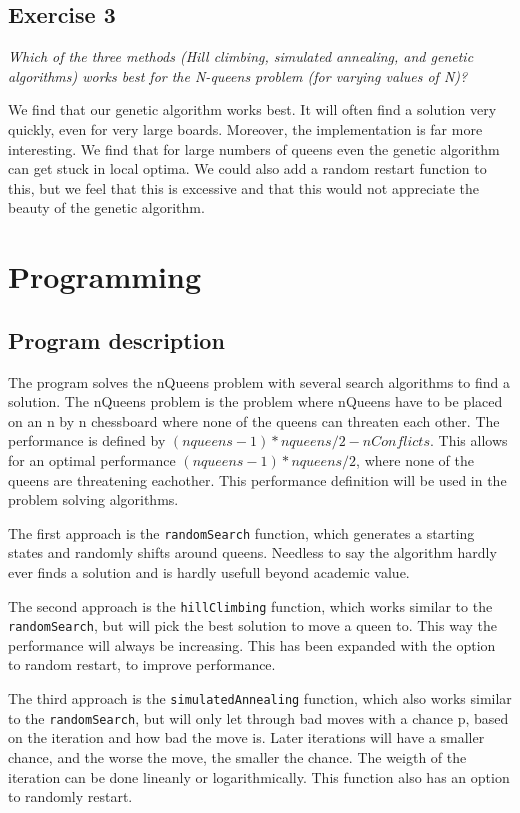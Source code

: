 \documentclass{article}
\begin{document}
\subsection*{Exercise 3}


\textit{Which of the three methods (Hill climbing, simulated annealing, and genetic algorithms) works best for the N-queens problem (for varying values of N)?}

We find that our genetic algorithm works best. It will often find a solution very quickly, even for very large boards. Moreover, the implementation is far more interesting. We find that for large numbers of queens even the genetic algorithm can get stuck in local optima. We could also add a random restart function to this, but we feel that this is excessive and that this would not appreciate the beauty of the genetic algorithm.


\section*{Programming} 
\subsection*{Program description}
The program solves the nQueens problem with several search algorithms to find a solution. The nQueens problem is the problem where nQueens have to be placed on an n by n chessboard where none of the queens can threaten each other.
The performance is defined by $ (nqueens-1)*nqueens/2 -nConflicts$. This allows for an optimal performance $(nqueens-1)*nqueens/2$, where none of the queens are threatening eachother. This performance definition will be used in the problem solving algorithms.

The first approach is the \verb!randomSearch! function, which generates a starting states and randomly shifts around queens. Needless to say the algorithm hardly ever finds a solution and is hardly usefull beyond academic value.

The second approach is the \verb!hillClimbing! function, which works similar to the \verb!randomSearch!, but will pick the best solution to move a queen to. This way the performance will always be increasing. This has been expanded with the option to random restart, to improve performance.

The third approach is the \verb!simulatedAnnealing! function, which also works similar to the \verb!randomSearch!, but will only let through bad moves with a chance p, based on the iteration and how bad the move is. Later iterations will have a smaller chance, and the worse the move, the smaller the chance. The weigth of the iteration can be done lineanly or logarithmically. This function also has an option to randomly restart.
\end{document}
